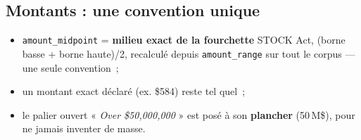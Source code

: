 \documentclass[11pt,a4paper]{article}
\newcommand{\co}[1]{\texttt{\small #1}}
\begin{document}
\subsection{Montants : une convention unique}
\begin{itemize}[nosep,leftmargin=1.5em]
\item \co{amount_midpoint} = \textbf{milieu exact de la fourchette} STOCK Act, (borne basse + borne
haute)/2, recalculé depuis \co{amount_range} sur tout le corpus — une seule convention~;
\item un montant exact déclaré (ex. \$584) reste tel quel~;
\item le palier ouvert « \emph{Over \$50,000,000} » est posé à son \textbf{plancher} (50\,M\$), pour ne
jamais inventer de masse.
\end{itemize}
\end{document}

